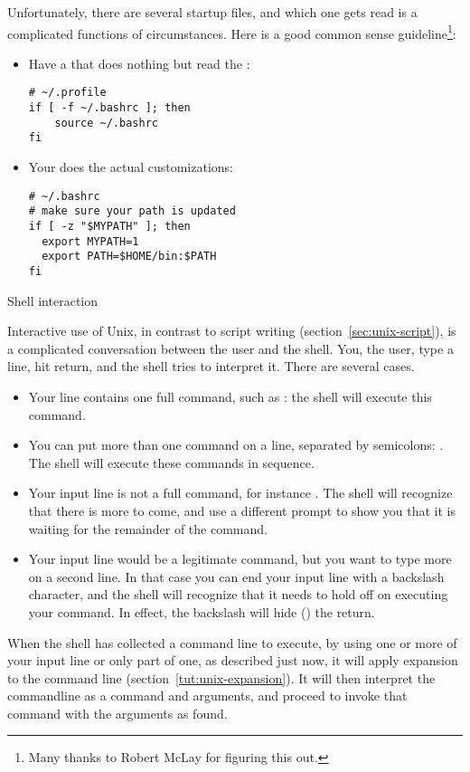 Unfortunately, there are several startup files, and which one gets read
is a complicated functions of circumstances. Here is a good common sense
guideline\footnote{Many thanks to Robert McLay for figuring this out.}:
\begin{itemize}
\item Have a  that does nothing but read the :
\begin{lstlisting}
# ~/.profile
if [ -f ~/.bashrc ]; then
    source ~/.bashrc
fi
\end{lstlisting}
\item Your  does the actual customizations:
\begin{lstlisting}
# ~/.bashrc
# make sure your path is updated
if [ -z "$MYPATH" ]; then
  export MYPATH=1
  export PATH=$HOME/bin:$PATH
fi
\end{lstlisting}
\end{itemize}


 {Shell interaction}

Interactive use of Unix, in contrast to script writing
(section~\ref{sec:unix-script}), is a complicated conversation between
the user and the shell. You, the user, type a line, hit return, and
the shell tries to interpret it. There are several cases.
\begin{itemize}
\item Your line contains one full command, such as : the
  shell will execute this command.
\item You can put more than one command on a line, separated by
  semicolons: . The shell will execute these
  commands in sequence.
\item Your input line is not a full command, for instance . The shell will recognize that there is more to come, and use
  a different prompt to show you that it is waiting for the remainder
  of the command.
\item Your input line would be a legitimate command, but you want to
  type more on a second line. In that case you can end your input line
  with a backslash character, and the shell will recognize that it
  needs to hold off on executing your command. In effect, the
  backslash will hide () the return.
\end{itemize}

When the shell has collected a command line to execute, by using one or
more of your input line or only part of one, as described just now, it
will apply expansion to the command line
(section~\ref{tut:unix-expansion}). It will then interpret the
commandline as a command and arguments, and proceed to invoke that
command with the arguments as found.

